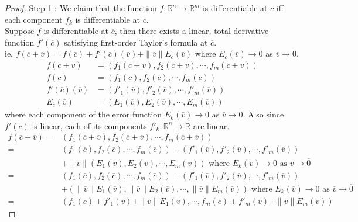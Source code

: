\begin{proof}
	\par{Step 1 :} We claim that the function $f : \mathbb{R}^n \to \mathbb{R}^m$ is differentiable at $\overline{c}$ iff each component $f_k$ is differentiable at $\overline{c}$.\\

	Suppose $f$ is differentiable at $\overline{c}$, then there exists a linear, total derivative function $f'(\overline{c})$ satisfying first-order Taylor's formula at $\overline{c}$.\\
	ie, $f(\overline{c}+\overline{v}) = f(\overline{c}) + f'(\overline{c})(\overline{v}) + \|\overline{v}\| E_{\overline{c}}(\overline{v})$ where $E_{\overline{c}}(\overline{v}) \to \overline{0}$ as $\overline{v} \to \overline{0}$.
	\begin{align*}
		f(\overline{c}+\overline{v}) & = \left( f_1(\overline{c}+\overline{v}), f_2(\overline{c}+\overline{v}), \cdots, f_m(\overline{c}+\overline{v}) \right)\\
		f(\overline{c}) & = \left( f_1(\overline{c}), f_2(\overline{c}), \cdots, f_m(\overline{c}) \right) \\
		f'(\overline{c})(\overline{v}) & = \left( f'_1(\overline{v}), f'_2(\overline{v}), \cdots, f'_m(\overline{v}) \right) \\
		E_{\overline{c}}(\overline{v}) & = \left( E_1(\overline{v}), E_2(\overline{v}), \cdots, E_m(\overline{v}) \right)
	\end{align*}
	where each component of the error function $E_k(\overline{v}) \to 0$ as $\overline{v} \to \overline{0}$. Also since $f'(\overline{c})$ is linear, each of its components $f'_k : \mathbb{R}^n \to \mathbb{R}$ are linear.
	\begin{align*}
		f(\overline{c}+\overline{v}) = & \left( f_1(\overline{c}+\overline{v}), f_2(\overline{c}+\overline{v}), \cdots, f_m(\overline{c}+\overline{v}) \right) \\
		= & \left( f_1(\overline{c}), f_2(\overline{c}), \cdots, f_m(\overline{c}) \right) + \left( f'_1(\overline{v}), f'_2(\overline{v}), \cdots, f'_m(\overline{v}) \right) \\
		& + \|\overline{v}\|\left(E_1(\overline{v}), E_2(\overline{v}), \cdots, E_m(\overline{v}) \right) \text{ where } E_k(\overline{v}) \to 0 \text{ as } \overline{v} \to \overline{0}\\
		= & \left( f_1(\overline{c}), f_2(\overline{c}), \cdots, f_m(\overline{c}) \right) + \left( f'_1(\overline{v}), f'_2(\overline{v}), \cdots, f'_m(\overline{v}) \right) \\
		& + \left(\|\overline{v}\|E_1(\overline{v}), \|\overline{v}\|E_2(\overline{v}), \cdots, \|\overline{v}\|E_m(\overline{v}) \right) \text{ where } E_k(\overline{v}) \to 0 \text{ as } \overline{v} \to \overline{0}\\
		= & \left( f_1(\overline{c}) + f'_1(\overline{v}) + \|\overline{v}\|E_1(\overline{v}), \cdots, f_m(\overline{c}) + f'_m(\overline{v}) + \|\overline{v}\|E_m(\overline{v}) \right) 
	\end{align*}


\end{proof}

